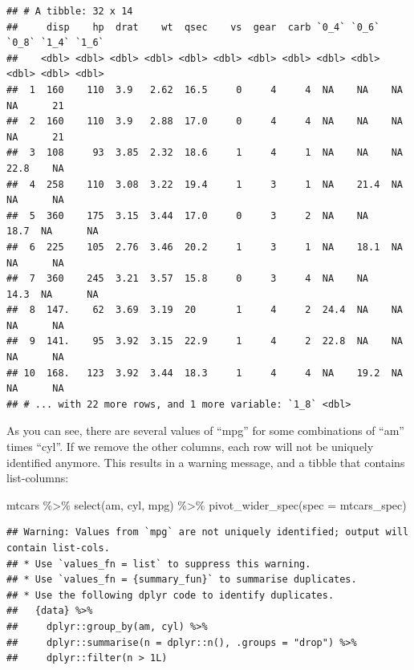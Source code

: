 \documentclass[
]{article}
\newenvironment{Shaded}{\begin{snugshade}}{\end{snugshade}}
\newcommand{\AttributeTok}[1]{\textcolor[rgb]{0.77,0.63,0.00}{#1}}
\newcommand{\FunctionTok}[1]{\textcolor[rgb]{0.00,0.00,0.00}{#1}}
\newcommand{\NormalTok}[1]{#1}
\newcommand{\SpecialCharTok}[1]{\textcolor[rgb]{0.00,0.00,0.00}{#1}}
\begin{document}
\begin{verbatim}
## # A tibble: 32 x 14
##     disp    hp  drat    wt  qsec    vs  gear  carb `0_4` `0_6` `0_8` `1_4` `1_6`
##    <dbl> <dbl> <dbl> <dbl> <dbl> <dbl> <dbl> <dbl> <dbl> <dbl> <dbl> <dbl> <dbl>
##  1  160    110  3.9   2.62  16.5     0     4     4  NA    NA    NA    NA      21
##  2  160    110  3.9   2.88  17.0     0     4     4  NA    NA    NA    NA      21
##  3  108     93  3.85  2.32  18.6     1     4     1  NA    NA    NA    22.8    NA
##  4  258    110  3.08  3.22  19.4     1     3     1  NA    21.4  NA    NA      NA
##  5  360    175  3.15  3.44  17.0     0     3     2  NA    NA    18.7  NA      NA
##  6  225    105  2.76  3.46  20.2     1     3     1  NA    18.1  NA    NA      NA
##  7  360    245  3.21  3.57  15.8     0     3     4  NA    NA    14.3  NA      NA
##  8  147.    62  3.69  3.19  20       1     4     2  24.4  NA    NA    NA      NA
##  9  141.    95  3.92  3.15  22.9     1     4     2  22.8  NA    NA    NA      NA
## 10  168.   123  3.92  3.44  18.3     1     4     4  NA    19.2  NA    NA      NA
## # ... with 22 more rows, and 1 more variable: `1_8` <dbl>
\end{verbatim}

As you can see, there are several values of ``mpg'' for some combinations of ``am'' times ``cyl''. If
we remove the other columns, each row will not be uniquely identified anymore. This results in a
warning message, and a tibble that contains list-columns:

\begin{Shaded}
\begin{Highlighting}[]
\NormalTok{mtcars }\SpecialCharTok{\%\textgreater{}\%} 
  \FunctionTok{select}\NormalTok{(am, cyl, mpg) }\SpecialCharTok{\%\textgreater{}\%} 
  \FunctionTok{pivot\_wider\_spec}\NormalTok{(}\AttributeTok{spec =}\NormalTok{ mtcars\_spec)}
\end{Highlighting}
\end{Shaded}

\begin{verbatim}
## Warning: Values from `mpg` are not uniquely identified; output will contain list-cols.
## * Use `values_fn = list` to suppress this warning.
## * Use `values_fn = {summary_fun}` to summarise duplicates.
## * Use the following dplyr code to identify duplicates.
##   {data} %>%
##     dplyr::group_by(am, cyl) %>%
##     dplyr::summarise(n = dplyr::n(), .groups = "drop") %>%
##     dplyr::filter(n > 1L)
\end{verbatim}
\end{document}
